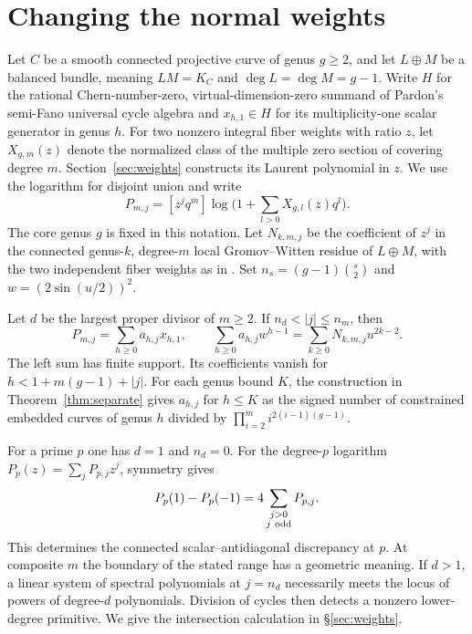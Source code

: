 \section{Changing the normal weights}\label{sec:statement}
Let $C$ be a smooth connected projective curve of genus $g\ge2$, and
let $L\oplus M$ be a balanced bundle, meaning
$LM=K_C$ and $\deg L=\deg M=g-1$. Write $H$ for the rational
Chern-number-zero, virtual-dimension-zero summand of Pardon's semi-Fano universal cycle algebra \cite[Definition~1.1 and Theorem~1.2]{Pardon} and
$x_{h,1}\in H$ for its multiplicity-one scalar generator in genus $h$.
For two nonzero integral fiber weights with ratio $z$, let
$X_{g,m}(z)$ denote the normalized class of the multiple zero section
of covering degree $m$. Section~\ref{sec:weights} constructs its
Laurent polynomial in $z$. We use the logarithm for disjoint union
and write
\[
 P_{m,j}=[z^j q^m]\log\Big(1+\sum_{l>0}X_{g,l}(z)q^l\Big).
\]
The core genus $g$ is fixed in this notation. Let $N_{k,m,j}$ be the
coefficient of $z^j$ in the connected genus-$k$, degree-$m$ local
Gromov--Witten residue of $L\oplus M$, with the two independent fiber
weights as in \cite{BP}. Set $n_s=(g-1)\binom{s}{2}$ and
$w=(2\sin(u/2))^2$.

\begin{theorem}\label{thm:main}
Let $d$ be the largest proper divisor of $m\ge2$. If
$n_d<|j|\le n_m$, then
\[
 P_{m,j}=\sum_{h\ge0}a_{h,j}x_{h,1},\qquad
 \sum_{h\ge0}a_{h,j}w^{h-1}
       =\sum_{k\ge0}N_{k,m,j}u^{2k-2}.
\]
The left sum has finite support. Its coefficients vanish for
$h<1+m(g-1)+|j|$. For each genus bound $K$, the construction in
Theorem~\ref{thm:separate} gives $a_{h,j}$ for $h\le K$ as the
signed number of constrained embedded curves of genus $h$ divided by
$\prod_{i=2}^m i^{2(i-1)(g-1)}$.
\end{theorem}

For a prime $p$ one has $d=1$ and $n_d=0$. For the degree-$p$ logarithm $P_p(z)=\sum_jP_{p,j}z^j$,
symmetry gives
\[
        P_p(1)-P_p(-1)=4\sum_{\substack{j>0\\j\ {\rm odd}}}P_{p,j}.
\]
This determines the connected scalar--antidiagonal discrepancy at $p$.
At composite $m$ the boundary of the stated
range has a geometric meaning. If $d>1$, a linear system of spectral
polynomials at $j=n_d$ necessarily meets the locus of powers of
degree-$d$ polynomials. Division of cycles then detects a nonzero
lower-degree primitive. We give the intersection calculation in
\S\ref{sec:weights}.

